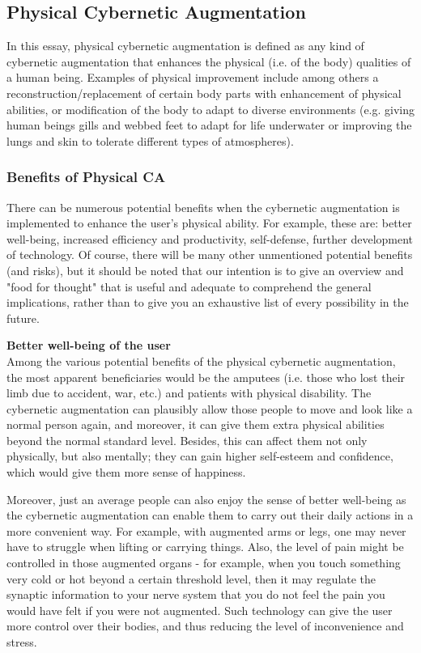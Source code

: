 \subsection{Physical Cybernetic Augmentation}

In this essay, physical cybernetic augmentation is defined as any kind of cybernetic augmentation that enhances the physical (i.e. of the body) qualities of a human being. Examples of physical improvement include among others a reconstruction/replacement of certain body parts with enhancement of physical abilities, or modification of the body to adapt to diverse environments (e.g. giving human beings gills and webbed feet to adapt for life underwater or improving the lungs and skin to tolerate different types of atmospheres).

\subsubsection{Benefits of Physical CA}

There can be numerous potential benefits when the cybernetic augmentation is implemented to enhance the user's physical ability. For example, these are: better well-being, increased efficiency and productivity, self-defense, further development of technology. Of course, there will be many other unmentioned potential benefits (and risks), but it should be noted that our intention is to give an overview and "food for thought" that is useful and adequate to comprehend the general implications, rather than to give you an exhaustive list of every possibility in the future. 


{\bf Better well-being of the user} \\
Among the various potential benefits of the physical cybernetic augmentation, the most apparent beneficiaries would be the amputees (i.e. those who lost their limb due to accident, war, etc.) and patients with physical disability. The cybernetic augmentation can plausibly allow those people to move and look like a normal person again, and moreover, it can give them extra physical abilities beyond the normal standard level. Besides, this can affect them not only physically, but also mentally; they can gain higher self-esteem and confidence, which would give them more sense of happiness. 

Moreover, just an average people can also enjoy the sense of better well-being as the cybernetic augmentation can enable them to carry out their daily actions in a more convenient way. For example, with augmented arms or legs, one may never have to struggle when lifting or carrying things. Also, the level of pain might be controlled in those augmented organs - for example, when you touch something very cold or hot beyond a certain threshold level, then it may regulate the synaptic information to your nerve system that you do not feel the pain you would have felt if you were not augmented. Such technology can give the user more control over their bodies, and thus reducing the level of inconvenience and stress.

